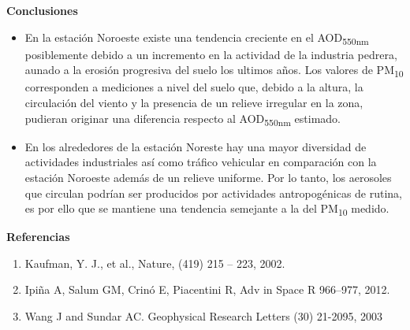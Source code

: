\documentclass{article}
\begin{document}
\begin{minipage}{0.70\linewidth}
\begin{center}
\begin{shaded}
\textbf{\textcolor{ver}{Conclusiones}}
\end{shaded}
\end{center}
\begin{itemize}
    \item En la estación Noroeste existe una tendencia creciente en el AOD\textsubscript{550nm} posiblemente debido a un incremento en la actividad de la industria
    pedrera, aunado a la erosión progresiva del suelo los ultimos años. Los valores de PM\textsubscript{10} corresponden a mediciones a nivel del suelo que, debido a la altura,
     la circulación del viento y la presencia de un relieve irregular en la zona, pudieran originar una diferencia respecto al AOD\textsubscript{550nm} estimado.
     \item En los alrededores de la estación Noreste hay una mayor diversidad de actividades industriales
     así como tráfico vehicular en comparación con la estación Noroeste además de un relieve uniforme. Por lo tanto, los aerosoles que
     circulan podrían ser producidos por actividades antropogénicas de rutina, es por ello que se mantiene una tendencia
      semejante a la del PM\textsubscript{10} medido.
\end{itemize}
\end{minipage}
\hspace{0.8cm}
\begin{minipage}{0.25\linewidth}
\vspace*{-0.6cm}
\begin{center}
\begin{shaded}
\textbf{\textcolor{ver}{Referencias}}
\end{shaded}
\end{center}
\begin{enumerate}
    \item Kaufman, Y. J., et al., Nature, (419) 215 – 223, 2002.
    \item Ipiña A, Salum GM, Crinó E, Piacentini R, Adv in Space R 966–977, 2012.
    \item Wang J and Sundar AC. Geophysical Research Letters (30) 21-2095, 2003
\end{enumerate}
\end{minipage}
\end{document}
